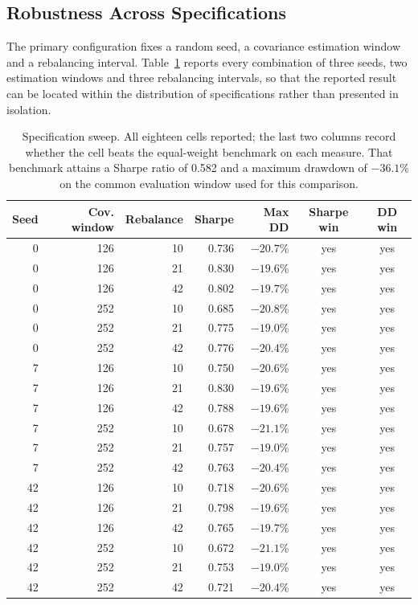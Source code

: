 \documentclass{singlecol-new}
\theoremstyle{TH}{
\newtheorem{lemma}{Lemma}
\newtheorem{theorem}[lemma]{Theorem}
\newtheorem{corrolary}[lemma]{Corrolary}
\newtheorem{conjecture}[lemma]{Conjecture}
\newtheorem{proposition}[lemma]{Proposition}
\newtheorem{claim}[lemma]{Claim}
\newtheorem{stheorem}[lemma]{Wrong Theorem}
\newtheorem{algorithm}{Algorithm}
}
\theoremstyle{THrm}{
\newtheorem{definition}{Definition}[section]
\newtheorem{question}{Question}[section]
\newtheorem{remark}{Remark}
\newtheorem{scheme}{Scheme}
}
\theoremstyle{THhit}{
\newtheorem{case}{Case}[section]
}
\begin{document}
\subsection{Robustness Across Specifications}
\label{sec:robust}

The primary configuration fixes a random seed, a covariance estimation window and a
rebalancing interval. Table~\ref{tab:sweep} reports every combination of three seeds, two estimation
windows and three rebalancing intervals, so that the reported result can be located
within the distribution of specifications rather than presented in isolation.

\begin{table}[!ht]
\centering
\caption{Specification sweep. All eighteen cells reported; the last two columns record
whether the cell beats the equal-weight benchmark on each measure. That benchmark attains
a Sharpe ratio of 0.582 and a maximum drawdown of $-36.1$\% on the common evaluation
window used for this comparison.}
\label{tab:sweep}
\small
\begin{tabular}{rrrrrcc}
\hline
\textbf{Seed} & \textbf{Cov. window} & \textbf{Rebalance} & \textbf{Sharpe} & \textbf{Max DD} & \textbf{Sharpe win} & \textbf{DD win} \\
\hline
0 & 126 & 10 & 0.736 & $-20.7$\% & yes & yes \\
0 & 126 & 21 & 0.830 & $-19.6$\% & yes & yes \\
0 & 126 & 42 & 0.802 & $-19.7$\% & yes & yes \\
0 & 252 & 10 & 0.685 & $-20.8$\% & yes & yes \\
0 & 252 & 21 & 0.775 & $-19.0$\% & yes & yes \\
0 & 252 & 42 & 0.776 & $-20.4$\% & yes & yes \\
7 & 126 & 10 & 0.750 & $-20.6$\% & yes & yes \\
7 & 126 & 21 & 0.830 & $-19.6$\% & yes & yes \\
7 & 126 & 42 & 0.788 & $-19.6$\% & yes & yes \\
7 & 252 & 10 & 0.678 & $-21.1$\% & yes & yes \\
7 & 252 & 21 & 0.757 & $-19.0$\% & yes & yes \\
7 & 252 & 42 & 0.763 & $-20.4$\% & yes & yes \\
42 & 126 & 10 & 0.718 & $-20.6$\% & yes & yes \\
42 & 126 & 21 & 0.798 & $-19.6$\% & yes & yes \\
42 & 126 & 42 & 0.765 & $-19.7$\% & yes & yes \\
42 & 252 & 10 & 0.672 & $-21.1$\% & yes & yes \\
42 & 252 & 21 & 0.753 & $-19.0$\% & yes & yes \\
42 & 252 & 42 & 0.721 & $-20.4$\% & yes & yes \\
\hline
\end{tabular}
\end{table}
\end{document}
